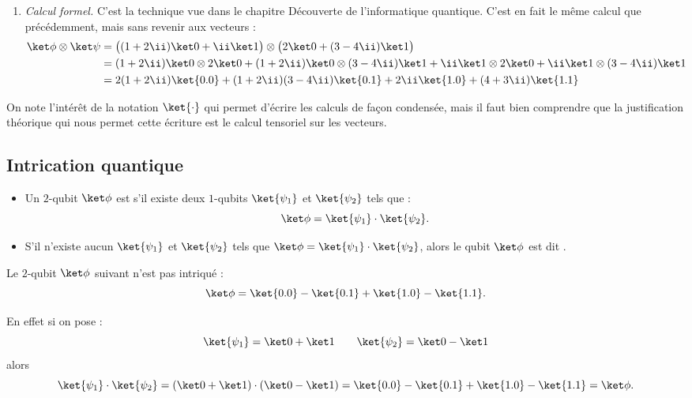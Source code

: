 \documentclass[11pt,class=report,crop=false]{standalone}
\begin{document}
\begin{exemple}
\begin{enumerate}
    
  \item \emph{Calcul formel.} C'est la technique vue dans le chapitre \og{}Découverte de l'informatique quantique\fg{}. C'est en fait le même calcul que précédemment, mais sans revenir aux vecteurs :
\begin{align*}
\ket \phi \otimes \ket \psi
  &= \big((1+2\ii)\ket0 + \ii\ket1\big) \otimes \big(2\ket0 + (3-4\ii)\ket1\big)  \\
  &=  (1+2\ii)\ket0 \otimes 2\ket0 
  + (1+2\ii)\ket0 \otimes (3-4\ii)\ket1
  + \ii\ket1 \otimes 2\ket0 
  + \ii\ket1 \otimes   (3-4\ii)\ket1 \\
  &= 2(1+2\ii) \ket{0.0} + (1+2\ii)(3-4\ii)\ket{0.1} + 2\ii\ket{1.0}+ (4+3\ii)\ket{1.1} \\
\end{align*}
\end{enumerate}    

On note l'intérêt de la notation $\ket{\cdot}$ qui permet d'écrire les calculs de façon condensée, mais il faut bien comprendre que la justification théorique qui nous permet cette écriture est le calcul tensoriel sur les vecteurs.
  
\end{exemple}


\subsection{Intrication quantique}


\begin{definition}
\sauteligne
\begin{itemize}
  \item Un $2$-qubit $\ket\phi$ est  s'il existe deux $1$-qubits $\ket{\psi_1}$ et $\ket{\psi_2}$ tels que :
$$\ket\phi = \ket{\psi_1} \cdot \ket{\psi_2}.$$
  \item S'il n'existe aucun $\ket{\psi_1}$
et $\ket{\psi_2}$ tels que $\ket\phi = \ket{\psi_1} \cdot \ket{\psi_2}$, alors
le qubit $\ket\phi$ est dit .
\end{itemize}
\end{definition}

\begin{exemple}
Le $2$-qubit $\ket\phi$ suivant n'est pas intriqué :
$$\ket\phi = \ket{0.0} - \ket{0.1} + \ket{1.0} - \ket{1.1}.$$

En effet si on pose :
$$\ket{\psi_1} = \ket0+\ket1 \qquad \ket{\psi_2} = \ket0-\ket1$$
alors
$$\ket{\psi_1}\cdot \ket{\psi_2} = (\ket0+\ket1) \cdot (\ket0-\ket1)
= \ket{0.0} - \ket{0.1} + \ket{1.0} - \ket{1.1} = \ket\phi.$$
\end{exemple}
\end{document}
